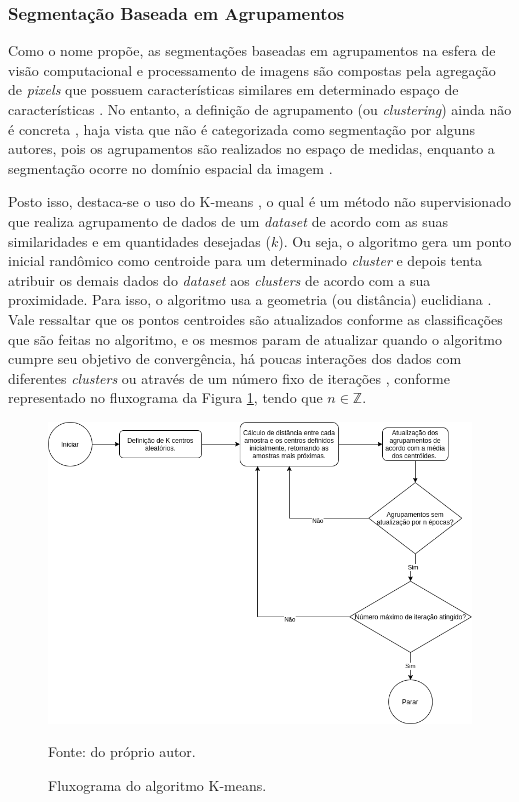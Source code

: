 \subsubsection{Segmentação Baseada em Agrupamentos}
\label{segment:group}

Como o nome propõe, as segmentações baseadas em agrupamentos na esfera de visão computacional e processamento de imagens são compostas pela agregação de \textit{pixels} que possuem características similares em determinado espaço de características \citep{Yuheng2017}. No entanto, a definição de agrupamento (ou \textit{clustering}) ainda não é concreta \citep{Yuheng2017}, haja vista que não é categorizada como segmentação por alguns autores, pois os agrupamentos são realizados no espaço de medidas, enquanto a segmentação ocorre no domínio espacial da imagem \citep{Haralick1985}.

Posto isso, destaca-se o uso do K-means \citep{macqueen1967some, bock2008origins}, o qual é um método não supervisionado que realiza agrupamento de dados de um \textit{dataset} de acordo com as suas similaridades e em quantidades desejadas ($k$). Ou seja, o algoritmo gera um ponto inicial randômico como centroide para um determinado \textit{cluster} e depois tenta atribuir os demais dados do \textit{dataset} aos \textit{clusters} de acordo com a sua proximidade. Para isso, o algoritmo usa a geometria (ou distância) euclidiana \citep{Mahmud2012}. Vale ressaltar que os pontos centroides são atualizados conforme as classificações que são feitas no algoritmo, e os mesmos param de atualizar quando o algoritmo cumpre seu objetivo de convergência, há poucas interações dos dados com diferentes \textit{clusters} ou através de um número fixo de iterações \citep{dunham2006data}, conforme representado no fluxograma da Figura \ref{segment:fig:6}, tendo que $n \in \mathbb{Z}$.

\begin{figure}[H]
    \centering
    \caption{Fluxograma do algoritmo K-means.}
    \includegraphics[width=1\linewidth]{recursos/imagens/image_seg/kmeans.png}
    \label{segment:fig:6}

    Fonte: do próprio autor.
\end{figure}

